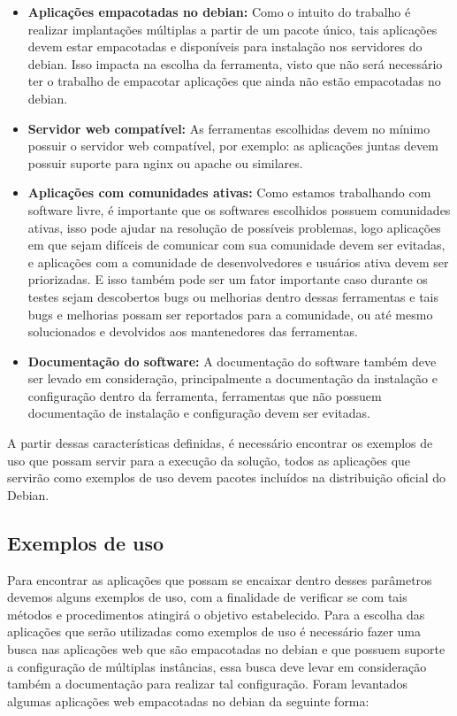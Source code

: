 \begin{itemize}
  \item  \textbf{Aplicações empacotadas no debian:}  Como o intuito do trabalho
  é realizar implantações múltiplas a partir de um pacote único, tais aplicações
  devem estar empacotadas e disponíveis para instalação nos servidores do debian.
  Isso impacta na escolha da ferramenta, visto que não será necessário ter o trabalho
  de empacotar aplicações que ainda não estão empacotadas no debian.
  \item  \textbf{Servidor web compatível:} As ferramentas escolhidas devem no
  mínimo possuir o servidor web compatível, por exemplo: as aplicações juntas
  devem possuir suporte para nginx ou apache ou similares.
  \item  \textbf{Aplicações com comunidades ativas:} Como estamos trabalhando
  com software livre, é importante que os softwares escolhidos possuem comunidades
  ativas, isso pode ajudar na resolução de  possíveis problemas, logo aplicações
  em que sejam difíceis de comunicar com sua comunidade devem ser evitadas, e
  aplicações com a comunidade de desenvolvedores e usuários ativa devem ser priorizadas.
  E isso também pode ser um fator importante caso durante os testes sejam descobertos
  bugs ou melhorias dentro dessas ferramentas e tais bugs e melhorias possam ser
  reportados para a comunidade, ou até mesmo solucionados e devolvidos aos mantenedores
  das ferramentas.
  \item  \textbf{Documentação do software:} A documentação do software também deve
  ser levado em consideração, principalmente a documentação da instalação e configuração
  dentro da ferramenta, ferramentas que não possuem documentação de instalação e
  configuração devem ser evitadas.
\end{itemize}

A partir dessas características definidas, é necessário encontrar os exemplos de uso
que possam servir para a execução da solução, todos as aplicações que servirão como
exemplos de uso devem pacotes incluídos na distribuição oficial do Debian.

\subsection{Exemplos de uso}
\label{subsection:exemplos}

Para encontrar as aplicações que possam se encaixar dentro desses parâmetros devemos
alguns exemplos de uso, com a finalidade de verificar se com tais métodos e
procedimentos atingirá o objetivo estabelecido. Para a escolha das aplicações que
serão utilizadas como exemplos de uso é necessário fazer uma busca nas aplicações
web que são empacotadas no debian e que possuem suporte a configuração de múltiplas
instâncias, essa busca deve levar em consideração também a documentação para realizar
tal configuração. Foram levantados algumas aplicações web empacotadas no debian da
seguinte forma:

